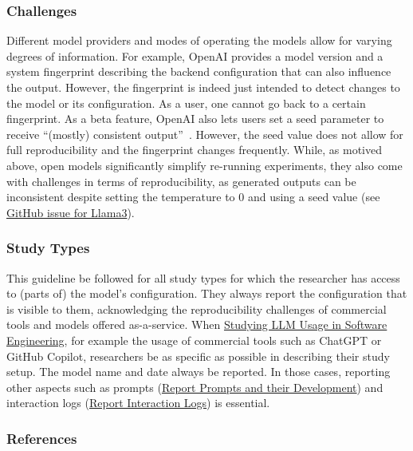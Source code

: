 \subsubsection{Challenges}

Different model providers and modes of operating the models allow for varying degrees of information.
For example, OpenAI provides a model version and a system fingerprint describing the backend configuration that can also influence the output.
However, the fingerprint is indeed just intended to detect changes to the model or its configuration.
As a user, one cannot go back to a certain fingerprint.
As a beta feature, OpenAI also lets users set a seed parameter to receive ``(mostly) consistent output''~\cite{OpenAI23}.
However, the seed value does not allow for full reproducibility and the fingerprint changes frequently. 
While, as motived above, open models significantly simplify re-running experiments, they also come with challenges in terms of reproducibility, as generated outputs can be inconsistent despite setting the temperature to 0 and using a seed value (see \href{https://github.com/ollama/ollama/issues/5321}{GitHub issue for Llama3}).


\subsubsection{Study Types}

This guideline \must be followed for all study types for which the researcher has access to (parts of) the model's configuration.
They \must always report the configuration that is visible to them, acknowledging the reproducibility challenges of commercial tools and models offered as-a-service. 
When \href{/study-types/#studying-llm-usage-in-software-engineering}{Studying LLM Usage in Software Engineering}, for example the usage of commercial tools such as ChatGPT or GitHub Copilot, researchers \must be as specific as possible in describing their study setup.
The model name and date \must always be reported.
In those cases, reporting other aspects such as prompts (\href{/guidelines/#report-prompts-and-their-development}{Report Prompts and their Development}) and interaction logs (\href{/guidelines//#report-interaction-logs}{Report Interaction Logs}) is essential.


\subsubsection{References}





